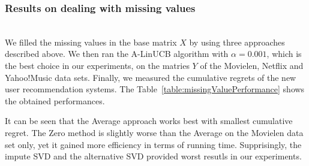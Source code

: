 \documentclass[twoside,leqno,twocolumn]{article}
\begin{document}

\subsubsection{Results on dealing with missing values}
~\\
We filled the missing values in the base matrix $X$ by using three approaches described above. We then ran the A-LinUCB algorithm with $\alpha=0.001$, which is the best choice in our experiments, on the matries $Y$ of the Movielen, Netflix and Yahoo!Music data sets. Finally, we measured the cumulative regrets of the new user recommendation systems. The Table~\ref{table:missingValuePerformance} shows the obtained performances.

It can be seen that the Average approach works best with smallest cumulative regret. The Zero method is slightly worse than the Average on the Movielen data set only, yet it gained more efficiency in terms of running time. Supprisingly, the impute SVD and the alternative SVD provided worst resutls in our experiments.
\end{document}
